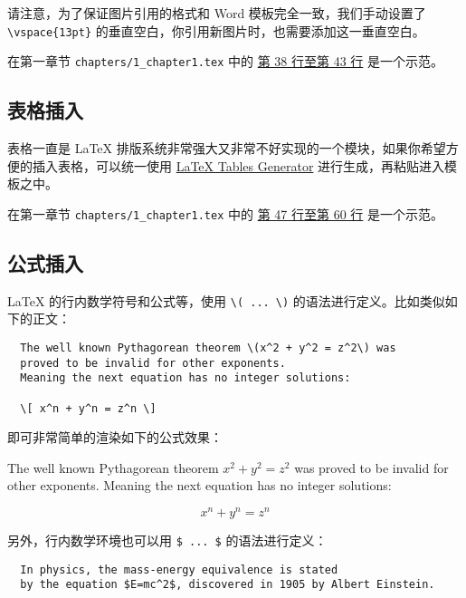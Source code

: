 请注意，为了保证图片引用的格式和 Word 模板完全一致，我们手动设置了 \verb|\vspace{13pt}| 的垂直空白，你引用新图片时，也需要添加这一垂直空白。

在第一章节 \texttt{chapters/1\_chapter1.tex} 中的 \href{https://github.com/spencerwooo/BIThesis/blob/master/graduation-thesis/chapters/1_chapter1.tex#L38-L43}{第 38 行至第 43 行} 是一个示范。

\subsection{表格插入}

表格一直是 {\LaTeX} 排版系统非常强大又非常不好实现的一个模块，如果你希望方便的插入表格，可以统一使用 \href{https://www.tablesgenerator.com/}{LaTeX Tables Generator} 进行生成，再粘贴进入模板之中。

在第一章节 \texttt{chapters/1\_chapter1.tex} 中的 \href{https://github.com/spencerwooo/BIThesis/blob/master/graduation-thesis/chapters/1_chapter1.tex#L47-L60}{第 47 行至第 60 行} 是一个示范。

\subsection{公式插入}

{\LaTeX} 的行内数学符号和公式等，使用 \verb|\( ... \)| 的语法进行定义。比如类似如下的正文：

\begin{verbatim}
  The well known Pythagorean theorem \(x^2 + y^2 = z^2\) was
  proved to be invalid for other exponents.
  Meaning the next equation has no integer solutions:

  \[ x^n + y^n = z^n \]
\end{verbatim}

即可非常简单的渲染如下的公式效果：

The well known Pythagorean theorem \(x^2 + y^2 = z^2\) was proved to be invalid for other exponents. Meaning the next equation has no integer solutions:

\[ x^n + y^n = z^n \]

另外，行内数学环境也可以用 \verb|$ ... $| 的语法进行定义：

\begin{verbatim}
  In physics, the mass-energy equivalence is stated
  by the equation $E=mc^2$, discovered in 1905 by Albert Einstein.
\end{verbatim}

